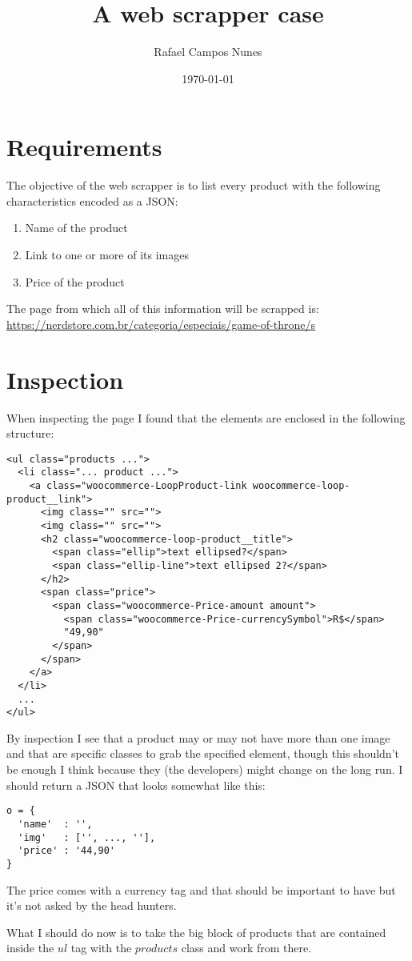\documentclass[11pt]{article}
\author{Rafael Campos Nunes}
\date{\today}
\title{A web scrapper case}
\begin{document}
\maketitle
\tableofcontents


\section{Requirements}
\label{sec:org0c31e00}


The objective of the web scrapper is to list every product with the following
characteristics encoded as a JSON:

\begin{enumerate}
\item Name of the product
\item Link to one or more of its images
\item Price of the product
\end{enumerate}

The page from which all of this information will be scrapped is:
\url{https://nerdstore.com.br/categoria/especiais/game-of-throne/s}

\section{Inspection}
\label{sec:org0f548ea}

When inspecting the page I found that the elements are enclosed in the following
structure:

\begin{verbatim}
<ul class="products ...">
  <li class="... product ...">
    <a class="woocommerce-LoopProduct-link woocommerce-loop-product__link">
      <img class="" src="">
      <img class="" src="">
      <h2 class="woocommerce-loop-product__title">
        <span class="ellip">text ellipsed?</span>
        <span class="ellip-line">text ellipsed 2?</span>
      </h2>
      <span class="price">
        <span class="woocommerce-Price-amount amount">
          <span class="woocommerce-Price-currencySymbol">R$</span>
          "49,90"
        </span>
      </span>
    </a>
  </li>
  ...
</ul>
\end{verbatim}

By inspection I see that a product may or may not have more than one image and
that are specific classes to grab the specified element, though this shouldn't
be enough I think because they (the developers) might change on the long run. I
should return a JSON that looks somewhat like this:

\begin{verbatim}
o = {
  'name'  : '',
  'img'   : ['', ..., ''],
  'price' : '44,90'
}
\end{verbatim}

The price comes with a currency tag and that should be important to have but
it's not asked by the head hunters.

What I should do now is to take the big block of products that are contained
inside the \(ul\) tag with the \(products\) class and work from there.
\end{document}
